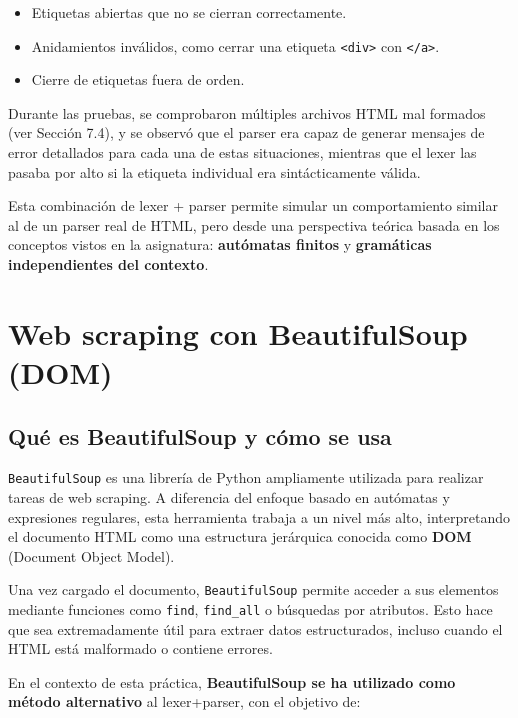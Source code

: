 \documentclass[11pt,a4paper]{article}
\begin{document}
\begin{itemize}
    \item Etiquetas abiertas que no se cierran correctamente.
    \item Anidamientos inválidos, como cerrar una etiqueta \texttt{<div>} con \texttt{</a>}.
    \item Cierre de etiquetas fuera de orden.
\end{itemize}

\medskip

Durante las pruebas, se comprobaron múltiples archivos HTML mal formados (ver Sección 7.4), y se observó que el parser era capaz de generar mensajes de error detallados para cada una de estas situaciones, mientras que el lexer las pasaba por alto si la etiqueta individual era sintácticamente válida.

\medskip

Esta combinación de lexer + parser permite simular un comportamiento similar al de un parser real de HTML, pero desde una perspectiva teórica basada en los conceptos vistos en la asignatura: \textbf{autómatas finitos} y \textbf{gramáticas independientes del contexto}.

\section{Web scraping con BeautifulSoup (DOM)}
\subsection{Qué es BeautifulSoup y cómo se usa}

\texttt{BeautifulSoup} es una librería de Python ampliamente utilizada para realizar tareas de web scraping. A diferencia del enfoque basado en autómatas y expresiones regulares, esta herramienta trabaja a un nivel más alto, interpretando el documento HTML como una estructura jerárquica conocida como \textbf{DOM} (Document Object Model).

\medskip

Una vez cargado el documento, \texttt{BeautifulSoup} permite acceder a sus elementos mediante funciones como \texttt{find}, \texttt{find\_all} o búsquedas por atributos. Esto hace que sea extremadamente útil para extraer datos estructurados, incluso cuando el HTML está malformado o contiene errores.

\medskip

En el contexto de esta práctica, \textbf{BeautifulSoup se ha utilizado como método alternativo} al lexer+parser, con el objetivo de:
\end{document}
